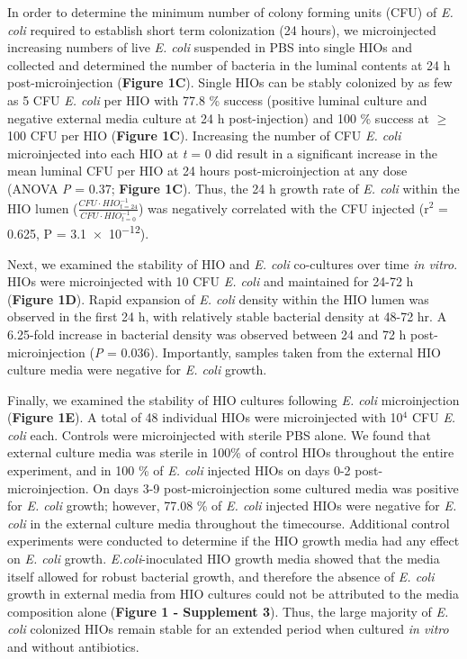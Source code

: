 \documentclass[9pt,lineo]{elife}
\begin{document}
In order to determine the minimum number of colony forming units (CFU) of \emph{E. coli} required to establish short term colonization (24 hours), we microinjected increasing numbers of live \emph{E. coli} suspended in PBS into single HIOs and collected and determined the number of bacteria in the luminal contents at 24 h post-microinjection (\textbf{Figure 1C}). Single HIOs can be stably colonized by as few as 5 CFU \emph{E. coli} per HIO with 77.8 \% success (positive luminal culture and negative external media culture at 24 h post-injection) and 100 \% success at \(\ge\) 100 CFU per HIO (\textbf{Figure 1C}).  Increasing the number of CFU \emph{E. coli} microinjected into each HIO at \emph{t} = 0 did result in a significant increase in the mean luminal CFU per HIO at 24 hours post-microinjection at any dose (ANOVA \emph{P} = 0.37; \textbf{Figure 1C}). Thus, the 24 h growth rate of \emph{E. coli} within the HIO lumen \Big($\frac{CFU\cdot{}HIO_{\textit{t}=24}^{-1}}{CFU\cdot{}HIO_{\textit{t}=0}^{-1}}$\Big) was negatively correlated with the CFU injected (r\(^{\text{2}}\) = 0.625, P = \num{3.1e-12}). 

Next, we examined the stability of HIO and \emph{E. coli} co-cultures over time \emph{in vitro}. HIOs were microinjected with 10 CFU \emph{E. coli} and maintained for 24-72 h (\textbf{Figure 1D}). Rapid expansion of \emph{E. coli} density within the HIO lumen was observed in the first 24 h, with relatively stable bacterial density at 48-72 hr. A 6.25-fold increase in bacterial density was observed between 24 and 72 h post-microinjection (\emph{P} = 0.036). Importantly, samples taken from the external HIO culture media were negative for \emph{E. coli} growth.

Finally, we examined the stability of HIO cultures following \emph{E. coli} microinjection (\textbf{Figure 1E}). A total of 48 individual HIOs were microinjected with 10\(^{\text{4}}\) CFU \emph{E. coli} each. Controls were microinjected with sterile PBS alone. We found that external culture media was sterile in 100\% of control HIOs throughout the entire experiment, and in 100 \% of \emph{E. coli} injected HIOs on days 0-2 post-microinjection. On days 3-9 post-microinjection some cultured media was positive for \emph{E. coli} growth; however, 77.08 \% of \emph{E. coli} injected HIOs were negative for \emph{E. coli} in the external culture media throughout the timecourse. Additional control experiments were conducted to determine if the HIO growth media had any effect on \emph{E. coli} growth. \emph{E.coli}-inoculated HIO growth media showed that the media itself allowed for robust bacterial growth, and therefore the absence of \emph{E. coli} growth in external media from HIO cultures could not be attributed to the media composition alone (\textbf{Figure 1 - Supplement 3}). Thus, the large majority of \emph{E. coli} colonized HIOs remain stable for an extended period when cultured \emph{in vitro} and without antibiotics.
\end{document}
